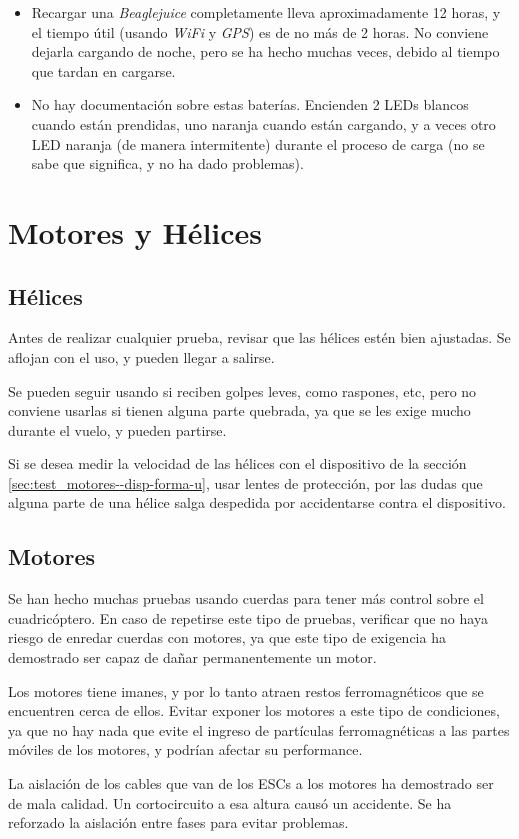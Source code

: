 \documentclass[main]{subfiles}
\begin{document}
\begin{itemize}
\item Recargar una \textit{Beaglejuice} completamente lleva aproximadamente 12 horas, y el tiempo útil (usando \textit{WiFi} y \textit{GPS}) es de no más de 2 horas. No conviene dejarla cargando de noche, pero se ha hecho muchas veces, debido al tiempo que tardan en cargarse.
\item No hay documentación sobre estas baterías. Encienden 2 LEDs blancos cuando están prendidas, uno naranja cuando están cargando, y a veces otro LED naranja (de manera intermitente) durante el proceso de carga (no se sabe que significa, y no ha dado problemas).
\end{itemize}

\section{Motores y Hélices}
\label{sec:hardware-cuidados--motores-y-helices}

\subsection{Hélices}
\label{sec:hardware-cuidados--helices}

Antes de realizar cualquier prueba, revisar que las hélices estén bien ajustadas. Se aflojan con el uso, y pueden llegar a salirse.

Se pueden seguir usando si reciben golpes leves, como raspones, etc, pero no conviene usarlas si tienen alguna parte quebrada, ya que se les exige mucho durante el vuelo, y pueden partirse.

Si se desea medir la velocidad de las hélices con el dispositivo de la sección \ref{sec:test_motores--disp-forma-u}, usar lentes de protección, por las dudas que alguna parte de una hélice salga despedida por accidentarse contra el dispositivo.

\subsection{Motores}
\label{sec:hardware-cuidados--helices}

Se han hecho muchas pruebas usando cuerdas para tener más control sobre el cuadricóptero. En caso de repetirse este tipo de pruebas, verificar que no haya riesgo de enredar cuerdas con motores, ya que este tipo de exigencia ha demostrado ser capaz de dañar permanentemente un motor.

Los motores tiene imanes, y por lo tanto atraen restos ferromagnéticos que se encuentren cerca de ellos. Evitar exponer los motores a este tipo de condiciones, ya que no hay nada que evite el ingreso de partículas ferromagnéticas a las partes móviles de los motores, y podrían afectar su performance.

La aislación de los cables que van de los ESCs a los motores ha demostrado ser de mala calidad. Un cortocircuito a esa altura causó un accidente. Se ha reforzado la aislación entre fases para evitar problemas.
\end{document}
